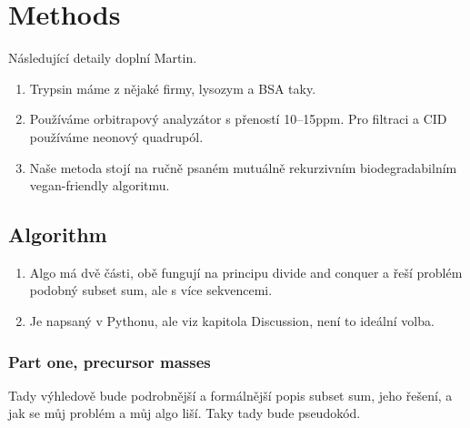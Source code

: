 \chapter{Methods}
\label{chap:something}

Následující detaily doplní Martin.

\begin{enumerate}
	\item Trypsin máme z nějaké firmy, lysozym a BSA taky.
	\item Používáme orbitrapový analyzátor s přeností 10–15ppm. Pro filtraci a CID používáme neonový quadrupól.
	\item Naše metoda stojí na ručně psaném mutuálně rekurzivním biodegradabilním vegan-friendly algoritmu.
\end{enumerate}

\section{Algorithm}

\begin{enumerate}
	\item Algo má dvě části, obě fungují na principu divide and conquer a řeší problém podobný subset sum, ale s více sekvencemi.
	\item Je napsaný v Pythonu, ale viz kapitola Discussion, není to ideální volba.
\end{enumerate}

\subsection{Part one, precursor masses}

Tady výhledově bude podrobnější a formálnější popis subset sum, jeho řešení, a jak se můj problém a můj algo liší. Taky tady bude pseudokód.

